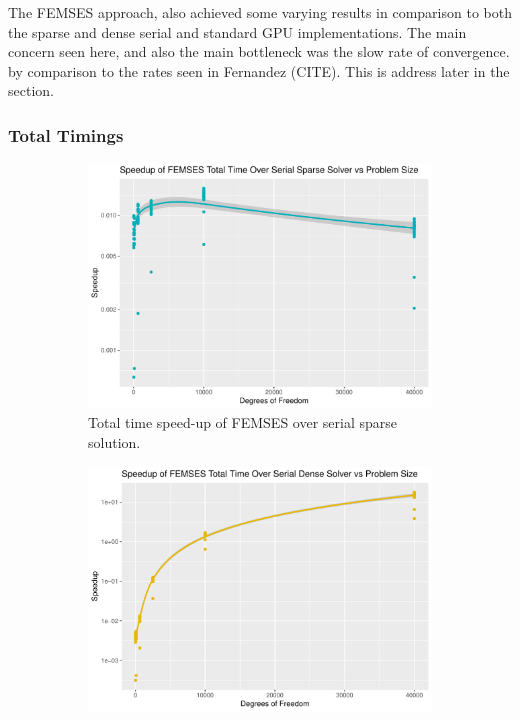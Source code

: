 The FEMSES approach, also achieved some varying results in comparison to both the sparse and dense serial and standard GPU implementations. The main concern seen here, and also the main bottleneck was the slow rate of convergence. by comparison to the rates seen in Fernandez (CITE). This is address later in the section.

\subsubsection{Total Timings}

\begin{figure}
	\centering
	\begin{subfigure}{0.48\linewidth}
		\centering
		\includegraphics[width = \linewidth]{Plots/total_femses_cpu_sparse_speedup_vs_n}
		\caption{Total time speed-up of FEMSES over serial sparse solution.}
		\label{fig:tot_femses_sparse}
	\end{subfigure}\hfill
	\begin{subfigure}{0.48\linewidth}
		\centering
		\includegraphics[width=\linewidth]{Plots/total_femses_cpu_dense_speedup_vs_n}

\end{subfigure}
\end{figure}
